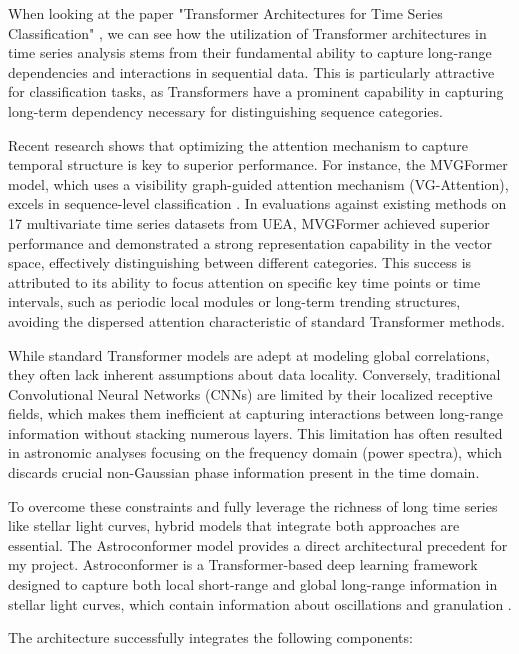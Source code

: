 \documentclass[letterpaper]{article} %
\begin{document}
When looking at the paper "Transformer Architectures for Time Series Classification" \cite{wen2023transformerstimeseriessurvey}, we can see how the utilization of Transformer architectures in time series analysis stems from their fundamental ability to capture long-range dependencies and interactions in sequential data. This is particularly attractive for classification tasks, as Transformers have a prominent capability in capturing long-term dependency necessary for distinguishing sequence categories.

Recent research shows that optimizing the attention mechanism to capture temporal structure is key to superior performance. For instance, the MVGFormer model, which uses a visibility graph-guided attention mechanism (VG-Attention), excels in sequence-level classification \cite{chen2025graphbased}. In evaluations against existing methods on 17 multivariate time series datasets from UEA, MVGFormer achieved superior performance and demonstrated a strong representation capability in the vector space, effectively distinguishing between different categories. This success is attributed to its ability to focus attention on specific key time points or time intervals, such as periodic local modules or long-term trending structures, avoiding the dispersed attention characteristic of standard Transformer methods.

While standard Transformer models are adept at modeling global correlations, they often lack inherent assumptions about data locality. Conversely, traditional Convolutional Neural Networks (CNNs) are limited by their localized receptive fields, which makes them inefficient at capturing interactions between long-range information without stacking numerous layers. This limitation has often resulted in astronomic analyses focusing on the frequency domain (power spectra), which discards crucial non-Gaussian phase information present in the time domain.

To overcome these constraints and fully leverage the richness of long time series like stellar light curves, hybrid models that integrate both approaches are essential. The Astroconformer model provides a direct architectural precedent for my project. Astroconformer is a Transformer-based deep learning framework designed to capture both local short-range and global long-range information in stellar light curves, which contain information about oscillations and granulation \cite{pan2024astroconformer}.

The architecture successfully integrates the following components:
\end{document}
